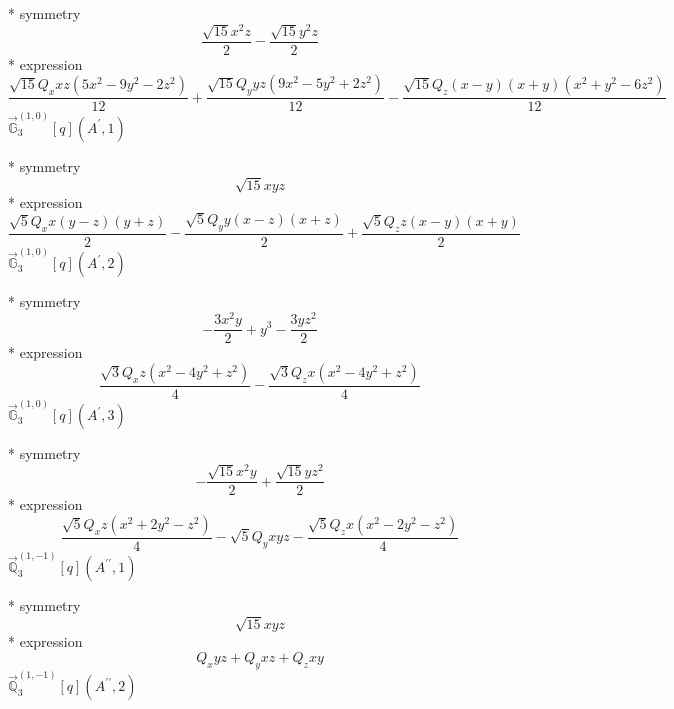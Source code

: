 \documentclass[fleqn,8pt]{jsarticle}
\begin{document}
\noindent\quad ** symmetry
\begin{dmath*}
\frac{\sqrt{15} x^{2} z}{2} - \frac{\sqrt{15} y^{2} z}{2}
\end{dmath*}
\noindent\quad ** expression
\begin{dmath*}
\frac{\sqrt{15} Q_{x} x z \left(5 x^{2} - 9 y^{2} - 2 z^{2}\right)}{12} + \frac{\sqrt{15} Q_{y} y z \left(9 x^{2} - 5 y^{2} + 2 z^{2}\right)}{12} - \frac{\sqrt{15} Q_{z} \left(x - y\right) \left(x + y\right) \left(x^{2} + y^{2} - 6 z^{2}\right)}{12}
\end{dmath*}
\noindent\quad $\vec{\mathbb{G}}_{3}^{(1,0)}[q](A^{\prime},1)$

\noindent\quad ** symmetry
\begin{dmath*}
\sqrt{15} x y z
\end{dmath*}
\noindent\quad ** expression
\begin{dmath*}
\frac{\sqrt{5} Q_{x} x \left(y - z\right) \left(y + z\right)}{2} - \frac{\sqrt{5} Q_{y} y \left(x - z\right) \left(x + z\right)}{2} + \frac{\sqrt{5} Q_{z} z \left(x - y\right) \left(x + y\right)}{2}
\end{dmath*}
\noindent\quad $\vec{\mathbb{G}}_{3}^{(1,0)}[q](A^{\prime},2)$

\noindent\quad ** symmetry
\begin{dmath*}
- \frac{3 x^{2} y}{2} + y^{3} - \frac{3 y z^{2}}{2}
\end{dmath*}
\noindent\quad ** expression
\begin{dmath*}
\frac{\sqrt{3} Q_{x} z \left(x^{2} - 4 y^{2} + z^{2}\right)}{4} - \frac{\sqrt{3} Q_{z} x \left(x^{2} - 4 y^{2} + z^{2}\right)}{4}
\end{dmath*}
\noindent\quad $\vec{\mathbb{G}}_{3}^{(1,0)}[q](A^{\prime},3)$

\noindent\quad ** symmetry
\begin{dmath*}
- \frac{\sqrt{15} x^{2} y}{2} + \frac{\sqrt{15} y z^{2}}{2}
\end{dmath*}
\noindent\quad ** expression
\begin{dmath*}
\frac{\sqrt{5} Q_{x} z \left(x^{2} + 2 y^{2} - z^{2}\right)}{4} - \sqrt{5} Q_{y} x y z - \frac{\sqrt{5} Q_{z} x \left(x^{2} - 2 y^{2} - z^{2}\right)}{4}
\end{dmath*}
\noindent\quad $\vec{\mathbb{Q}}_{3}^{(1,-1)}[q](A^{\prime\prime},1)$

\noindent\quad ** symmetry
\begin{dmath*}
\sqrt{15} x y z
\end{dmath*}
\noindent\quad ** expression
\begin{dmath*}
Q_{x} y z + Q_{y} x z + Q_{z} x y
\end{dmath*}
\noindent\quad $\vec{\mathbb{Q}}_{3}^{(1,-1)}[q](A^{\prime\prime},2)$
\end{document}
